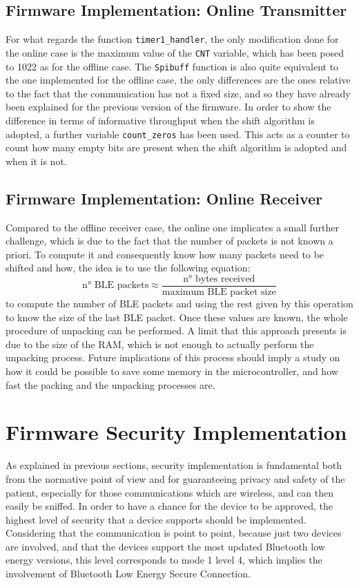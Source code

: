 \documentclass{Configuration_Files/PoliMi3i_thesis}
\begin{document}
\subsection{Firmware Implementation: Online Transmitter}

For what regards the function \texttt{timer1\_handler}, the only modification done for the online case is the maximum value of the \texttt{CNT} variable, which has been posed to 1022 as for the offline case. The \texttt{Spibuff} function is also quite equivalent to the one implemented for the offline case, the only differences are the ones relative to the fact that the communication has not a fixed size, and so they have already been explained for the previous version of the firmware. In order to show the difference in terms of informative throughput when the shift algorithm is adopted, a further variable \texttt{count\_zeros} has been used. This acts as a counter to count how many empty bits are present when the shift algorithm is adopted and when it is not.

\subsection{Firmware Implementation: Online Receiver}

Compared to the offline receiver case, the online one implicates a small further challenge, which is due to the fact that the number of packets is not known a priori. To compute it and consequently know how many packets need to be shifted and how, the idea is to use the following equation:
\[
\text{n° BLE packets} \approx \frac{\text{n° bytes received}}{\text{maximum BLE packet size}}
\]
to compute the number of BLE packets and using the rest given by this operation to know the size of the last BLE packet. Once these values are known, the whole procedure of unpacking can be performed.
A limit that this approach presents is due to the size of the RAM, which is not enough to actually perform the unpacking process. Future implications of this process should imply a study on how it could be possible to save some memory in the microcontroller, and how fast the packing and the unpacking processes are.


\section{Firmware Security Implementation}
As explained in previous sections, security implementation is fundamental both from the normative point of view and for guaranteeing privacy and safety of the patient, especially for those communications which are wireless, and can then easily be sniffed. In order to have a chance for the device to be approved, the highest level of security that a device supports should be implemented. Considering that the communication is point to point, because just two devices are involved, and that the devices support the most updated Bluetooth low energy versions, this level corresponds to mode 1 level 4, which implies the involvement of Bluetooth Low Energy Secure Connection.
\end{document}
